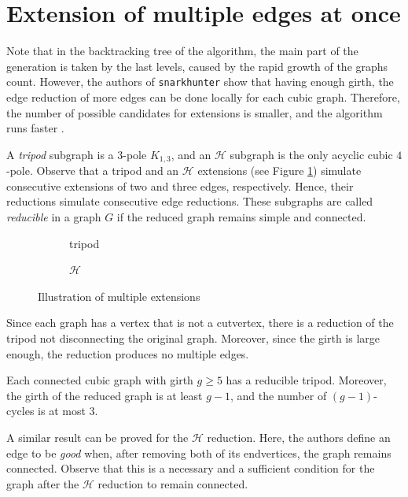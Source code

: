 \section{Extension of multiple edges at once}

Note that in the backtracking tree of the algorithm, the main part of the generation is taken by the last levels, caused by the rapid growth of the graphs count. However, the authors of \texttt{snarkhunter} show that having enough girth, the edge reduction of more edges can be done locally for each cubic graph. Therefore, the number of possible candidates for extensions is smaller, and the algorithm runs faster \cite{snarkhunter_better}.

A \emph{tripod} subgraph is a $3$-pole $K_{1, 3}$, and an $\mathcal H$ subgraph is the only acyclic cubic $4$-pole. Observe that a tripod and an $\mathcal H$ extensions (see Figure \ref{fig:multiple_extensions}) simulate consecutive extensions of two and three edges, respectively. Hence, their reductions simulate consecutive edge reductions. These subgraphs are called \emph{reducible} in a graph $G$ if the reduced graph remains simple and connected.

\begin{figure}[h!]
    \centering
    \begin{subfigure}{0.4\textwidth}
        \centering
        
        \caption{tripod}
    \end{subfigure}
    \begin{subfigure}{0.4\textwidth}
        \centering
        
        \caption{$\mathcal H$}
    \end{subfigure}
    \caption{Illustration of multiple extensions}
    \label{fig:multiple_extensions}
\end{figure}

Since each graph has a vertex that is not a cutvertex, there is a reduction of the tripod not disconnecting the original graph. Moreover, since the girth is large enough, the reduction produces no multiple edges.

\begin{theorem}\emph{\cite[p. 260]{snarkhunter_better}}
    Each connected cubic graph with girth $g\geq 5$ has a reducible tripod. Moreover, the girth of the reduced graph is at least $g-1$, and the number of $(g-1)$-cycles is at most $3$.
\end{theorem}

A similar result can be proved for the $\mathcal H$ reduction. Here, the authors define an edge to be \emph{good} when, after removing both of its endvertices, the graph remains connected. Observe that this is a necessary and a sufficient condition for the graph after the $\mathcal H$ reduction to remain connected.

